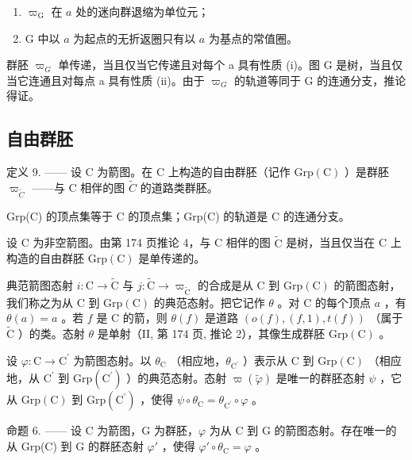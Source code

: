\begin{enumerate}
\def\labelenumi{(\roman{enumi})}
\item
  \(\varpi_{\mathrm{G}}\) 在 \(a\) 处的迷向群退缩为单位元；
\item
  G 中以 \(a\) 为起点的无折返圈只有以 \(a\) 为基点的常值圈。
\end{enumerate}

群胚 \(\varpi_{G}\) 单传递，当且仅当它传递且对每个 a 具有性质 (i)。图 G 是树，当且仅当它连通且对每点 a 具有性质 (ii)。由于 \(\varpi_{G}\) 的轨道等同于 G 的连通分支，推论得证。

\subsection{自由群胚}

定义 9. —— 设 C 为箭图。在 C 上构造的自由群胚（记作 \(\mathrm{Grp}(\mathrm{C})\) ）是群胚 \(\varpi_{\widetilde{C}}\) ——与 C 相伴的图 \(\widetilde{C}\) 的道路类群胚。

Grp(C) 的顶点集等于 C 的顶点集；Grp(C) 的轨道是 C 的连通分支。

设 C 为非空箭图。由第 174 页推论 4，与 C 相伴的图 \(\widetilde{\mathrm{C}}\) 是树，当且仅当在 C 上构造的自由群胚 \(\mathrm{Grp}(\mathrm{C})\) 是单传递的。

典范箭图态射 \(i\colon \mathrm{C}\to \widetilde{\mathrm{C}}\) 与 \(j\colon \widetilde{\mathrm{C}}\to \varpi_{\widetilde{\mathrm{C}}}\) 的合成是从 C 到 \(\mathrm{Grp}(\mathrm{C})\) 的箭图态射，我们称之为从 C 到 \(\mathrm{Grp}(\mathrm{C})\) 的典范态射。把它记作 \(\theta\) 。对 C 的每个顶点 \(a\) ，有 \(\theta (a) = a\) 。若 \(f\) 是 C 的箭，则 \(\theta (f)\) 是道路 \((o(f),(f,1),t(f))\) （属于 \(\widetilde{\mathrm{C}}\) ）的类。态射 \(\theta\) 是单射（II, 第 174 页, 推论 2），其像生成群胚 \(\mathrm{Grp}(\mathrm{C})\) 。

设 \(\varphi\colon\mathrm{C}\to\mathrm{C}^{\prime}\) 为箭图态射。以 \(\theta_{\mathrm{C}}\) （相应地，\(\theta_{\mathrm{C}^{\prime}}\) ）表示从 C 到 \(\mathrm{Grp}(\mathrm{C})\) （相应地，从 \(\mathrm{C}^{\prime}\) 到 \(\mathrm{Grp}(\mathrm{C}^{\prime})\) ）的典范态射。态射 \(\varpi(\widetilde{\varphi})\) 是唯一的群胚态射 \(\psi\) ，它从 \(\mathrm{Grp}(\mathrm{C})\) 到 \(\mathrm{Grp}(\mathrm{C}^{\prime})\) ，使得 \(\psi\circ\theta_{\mathrm{C}}=\theta_{\mathrm{C}^{\prime}}\circ\varphi\) 。

命题 6. —— 设 C 为箭图，G 为群胚，\(\varphi\) 为从 C 到 G 的箭图态射。存在唯一的从 Grp(C) 到 G 的群胚态射 \(\varphi'\) ，使得 \(\varphi' \circ \theta_{\mathrm{C}} = \varphi\) 。


